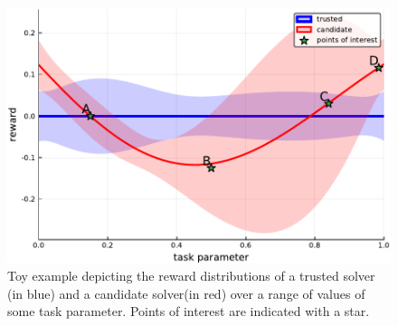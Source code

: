 \begin{figure}[tbp]
    \centering
    \includegraphics[width=0.9\linewidth]{Figures/p1}
    \caption{Toy example depicting the reward distributions of a trusted solver (in blue) and a candidate solver(in red) over a range of values of some task parameter. Points of interest are indicated with a star.}
    \label{fig:sq_thry1}
\end{figure}
